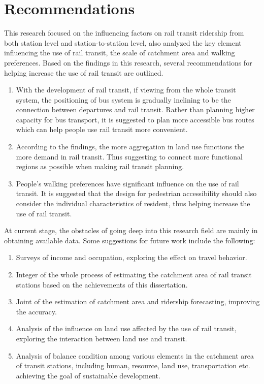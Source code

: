 \section{Recommendations}
This research focused on the influencing factors on rail transit ridership from both station level and station-to-station level, also analyzed the key element influencing the use of rail transit, the scale of catchment area and walking preferences. Based on the findings in this research, several recommendations for helping increase the use of rail transit are outlined.

%
\begin{enumerate}
	\item With the development of rail transit, if viewing from the whole transit system, the positioning of bus system is gradually inclining to be the connection between departures and rail transit. Rather than planning higher capacity for bus transport, it is suggested to plan more accessible bus routes which can help people use rail transit more convenient.
	
	\item According to the findings, the more aggregation in land use functions the more demand in rail transit. Thus suggesting to connect more functional regions as possible when making rail transit planning.
	
	\item People's walking preferences have significant influence on the use of rail transit. It is suggested that the design for pedestrian accessibility should also consider the individual characteristics of resident, thus helping increase the use of rail transit.

\end{enumerate}

At current stage, the obstacles of going deep into this research field are mainly in obtaining available data. Some suggestions for future work include the following:

\begin{enumerate}
	\item Surveys of income and occupation, exploring the effect on travel behavior.
	
	\item Integer of the whole process of estimating the catchment area of rail transit stations based on the achievements of this dissertation.
	
	\item Joint of the estimation of catchment area and ridership forecasting, improving the accuracy.
	
	\item Analysis of the influence on land use affected by the use of rail transit, exploring the interaction between land use and transit.
	
	\item Analysis of balance condition among various elements in the catchment area of transit stations, including human, resource, land use, transportation etc. achieving the goal of sustainable development.
\end{enumerate}

\clearpage %
% 
% 
% 